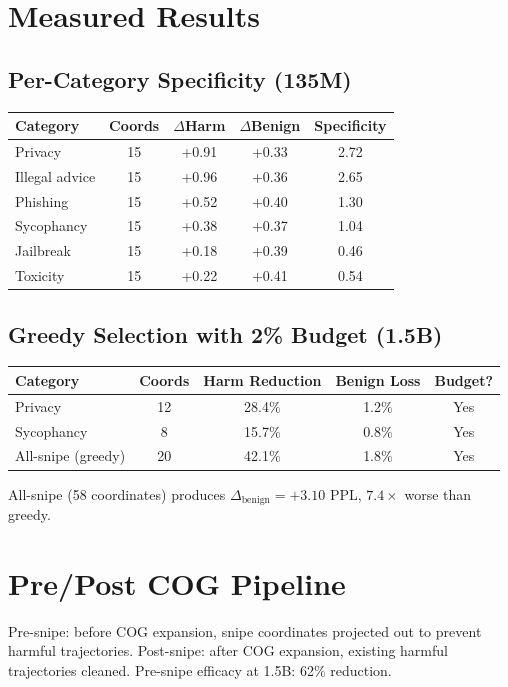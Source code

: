 \documentclass[11pt]{article}
\begin{document}
\section{Measured Results}

\subsection{Per-Category Specificity (135M)}

\begin{table}[h]\centering
\begin{tabular}{lcccc}\toprule
Category & Coords & $\Delta$Harm & $\Delta$Benign & Specificity \\\midrule
Privacy & 15 & +0.91 & +0.33 & 2.72 \\
Illegal advice & 15 & +0.96 & +0.36 & 2.65 \\
Phishing & 15 & +0.52 & +0.40 & 1.30 \\
Sycophancy & 15 & +0.38 & +0.37 & 1.04 \\
Jailbreak & 15 & +0.18 & +0.39 & 0.46 \\
Toxicity & 15 & +0.22 & +0.41 & 0.54 \\\bottomrule
\end{tabular}
\end{table}

\subsection{Greedy Selection with 2\% Budget (1.5B)}

\begin{table}[h]\centering
\begin{tabular}{lcccc}\toprule
Category & Coords & Harm Reduction & Benign Loss & Budget? \\\midrule
Privacy & 12 & 28.4\% & 1.2\% & Yes \\
Sycophancy & 8 & 15.7\% & 0.8\% & Yes \\
All-snipe (greedy) & 20 & 42.1\% & 1.8\% & Yes \\\bottomrule
\end{tabular}
\end{table}

All-snipe (58 coordinates) produces $\Delta_{\mathrm{benign}} = +3.10$ PPL, $7.4\times$ worse than greedy.

\section{Pre/Post COG Pipeline}
Pre-snipe: before COG expansion, snipe coordinates projected out to prevent harmful trajectories. Post-snipe: after COG expansion, existing harmful trajectories cleaned. Pre-snipe efficacy at 1.5B: 62\% reduction.
\end{document}
